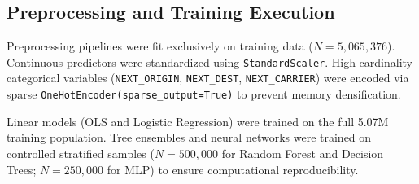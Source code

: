 \documentclass[conference]{IEEEtran}
\begin{document}
\subsection{Preprocessing and Training Execution}
Preprocessing pipelines were fit exclusively on training data ($N = 5,065,376$). Continuous predictors were standardized using \texttt{StandardScaler}. High-cardinality categorical variables (\texttt{NEXT\_ORIGIN}, \texttt{NEXT\_DEST}, \texttt{NEXT\_CARRIER}) were encoded via sparse \texttt{OneHotEncoder(sparse\_output=True)} to prevent memory densification.

Linear models (OLS and Logistic Regression) were trained on the full 5.07M training population. Tree ensembles and neural networks were trained on controlled stratified samples ($N = 500,000$ for Random Forest and Decision Trees; $N = 250,000$ for MLP) to ensure computational reproducibility.
\end{document}
